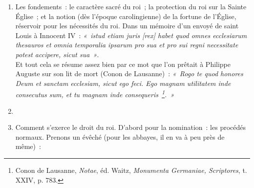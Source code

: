 \documentclass[french,twoside]{book} %
\newlength{\listmod}
\newcommand{\listhead}[1]{\hspace{-1\listmod}\emph{#1}}
\begin{document}
\begin{enumerate}[itemsep=\baselineskip,]
\item Les fondements : le caractère sacré du roi ; la protection du roi sur la Sainte Église ; et la notion (dès l’époque carolingienne) de la fortune de l’Église, réservoir pour les nécessités du roi. Dans un mémoire d’un envoyé de saint Louis à Innocent IV : \emph{« istud etiam juris [rex] habet quod omnes ecclesiarum thesauros et omnia temporalia ipsarum pro sua et pro sui regni necessitate potest accipere, sicut sua »}. \\
Et tout cela se résume assez bien par ce mot que l’on prêtait à Philippe Auguste sur son lit de mort (Conon de Lausanne) : \emph{« Rogo te quod honores Deum et sanctam ecclesiam, sicut ego feci. Ego magnam utilitatem inde consecutus sum, et tu magnam inde consequeris \footnote{ Conon de Lausanne, {\itshape Notae}, éd. Waitz, {\itshape Monumenta Germaniae, Scriptores}, t. XXIV, p. 783.}. »}
\item  
{}

 
\item  Comment s’exerce le droit du roi. D’abord pour la nomination : les procédés normaux. Prenons un évêché (pour les abbayes, il en va à peu près de même) :\par
 

\end{enumerate}
\end{document}
